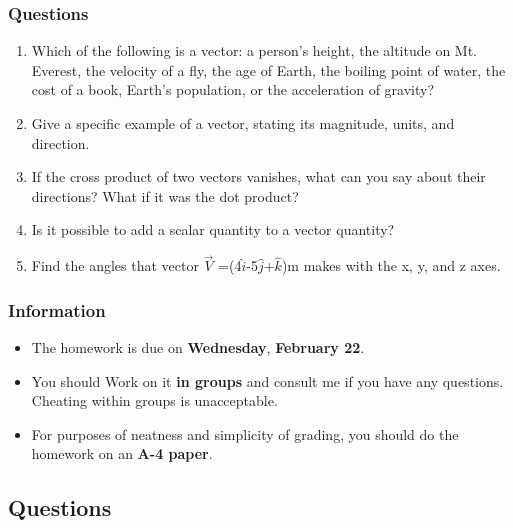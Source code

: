 \documentclass[9pt]{exam}
\begin{document}
\subsubsection*{Questions}
\begin{enumerate}
	\item Which of the following is a vector: a person’s height, the altitude on Mt. Everest, the velocity of a fly, the age of Earth, the boiling point of water, the cost of a book, Earth’s population, or the acceleration of gravity?
	\item Give a specific example of a vector, stating its magnitude, units, and direction.
	\item If the cross product of two vectors vanishes, what can you say about their directions? What if it was the dot product?
	\item Is it possible to add a scalar quantity to a vector quantity?
	\item Find the angles that vector  $\vec{V}$ =(4$\hat{i}$-5$\hat{j}$+$\hat{k}$)m makes with the x, y, and z axes.
\end{enumerate}
\begin{center}
	\subsubsection*{Information}
	\begin{itemize}
		\item The homework is due on \textbf{Wednesday}, \textbf{February 22}.
		\item You should Work on it \textbf{in groups} and consult me if you have any questions. Cheating within groups is unacceptable.
		\item For purposes of neatness and simplicity of grading, you should do the homework on an \textbf{A-4 paper}.
	\end{itemize}
\end{center}
\begin{center}
	\subsection*{Questions}
\end{center}
\end{document}
